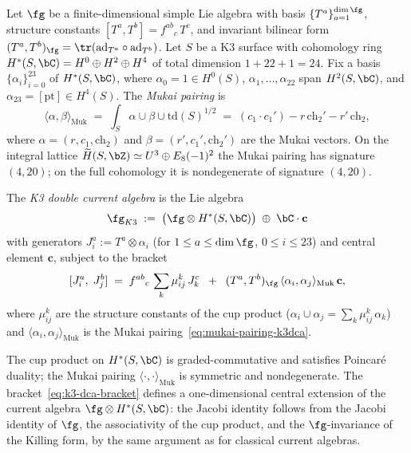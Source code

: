 \begin{definition}
\label{def:k3-double-current-algebra}
Let $\fg$ be a finite-dimensional simple Lie algebra with
basis $\{T^a\}_{a=1}^{\dim \fg}$,
structure constants $[T^a, T^b] = f^{ab}{}_{c}\,T^c$,
and invariant bilinear form $(T^a, T^b)_{\fg} = \tr(\mathrm{ad}_{T^a} \circ \mathrm{ad}_{T^b})$.
Let $S$ be a K3 surface with cohomology ring
$H^*(S, \bC) = H^0 \oplus H^2 \oplus H^4$ of total
dimension $1 + 22 + 1 = 24$.
Fix a basis $\{\alpha_i\}_{i=0}^{23}$ of $H^*(S, \bC)$, where
$\alpha_0 = 1 \in H^0(S)$, $\alpha_1, \ldots, \alpha_{22}$ span
$H^2(S, \bC)$, and $\alpha_{23} = [\mathrm{pt}] \in H^4(S)$.
The \emph{Mukai pairing} is
\begin{equation}\label{eq:mukai-pairing-k3dca}
  \langle \alpha, \beta \rangle_{\mathrm{Muk}}
  \;=\;
  \int_S \alpha \cup \beta \cup \mathrm{td}(S)^{1/2}
  \;=\;
  (c_1 \cdot c_1') - r\,\mathrm{ch}_2' - r'\,\mathrm{ch}_2,
\end{equation}
where $\alpha = (r, c_1, \mathrm{ch}_2)$ and $\beta = (r', c_1', \mathrm{ch}_2')$
are the Mukai vectors. On the integral lattice
$\widetilde{H}(S, \bZ) \simeq U^3 \oplus E_8(-1)^2$ the Mukai
pairing has signature $(4, 20)$; on the full cohomology it is
nondegenerate of signature $(4, 20)$.

The \emph{K3 double current algebra} is the Lie algebra
\begin{equation}\label{eq:k3-dca}
  \fg_{K3}
  \;:=\;
  \bigl(\fg \otimes H^*(S, \bC)\bigr)
  \;\oplus\;
  \bC \cdot \mathbf{c}
\end{equation}
with generators $J^a_i := T^a \otimes \alpha_i$
(for $1 \leq a \leq \dim \fg$, $0 \leq i \leq 23$)
and central element $\mathbf{c}$, subject to the bracket
\begin{equation}\label{eq:k3-dca-bracket}
  [J^a_i,\; J^b_j]
  \;=\;
  f^{ab}{}_{c}\, \sum_k \mu^k_{ij}\, J^c_k
  \;\;+\;\;
  (T^a, T^b)_{\fg}\,
  \langle \alpha_i, \alpha_j \rangle_{\mathrm{Muk}}\,
  \mathbf{c},
\end{equation}
where $\mu^k_{ij}$ are the structure constants of the cup product
($\alpha_i \cup \alpha_j = \sum_k \mu^k_{ij}\,\alpha_k$)
and $\langle \alpha_i, \alpha_j \rangle_{\mathrm{Muk}}$ is the
Mukai pairing~\eqref{eq:mukai-pairing-k3dca}.
\end{definition}

The cup product on $H^*(S,\bC)$ is graded-commutative
and satisfies Poincar\'e duality; the Mukai pairing
$\langle \cdot, \cdot \rangle_{\mathrm{Muk}}$ is symmetric and
nondegenerate. The bracket~\eqref{eq:k3-dca-bracket} defines a
one-dimensional central extension of the current algebra
$\fg \otimes H^*(S, \bC)$: the Jacobi identity follows from
the Jacobi identity of $\fg$, the associativity of the cup product,
and the $\fg$-invariance of the Killing form, by the same argument as
for classical current algebras.

